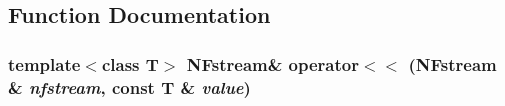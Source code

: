 \subsection{Function Documentation}
\subsubsection{\setlength{\rightskip}{0pt plus 5cm}template$<$class T$>$ {\bf NFstream}\& operator$<$$<$ ({\bf NFstream} \& {\em nfstream}, const T \& {\em value})\hspace{0.3cm}{\tt  [inline]}}\label{system_8cpp_ef588953052314e1b69285568a59947f}


